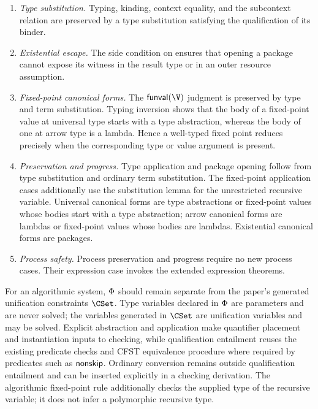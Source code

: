 \begin{enumerate}
  The derived rules require no additional cases: expanding their
  admissibility derivations reduces them to the cases above.  In particular,
  the subject of  is closed, so substitution leaves
  it unchanged.  This completes the induction.
\item \emph{Type substitution.}  Typing, kinding, context equality, and the
  subcontext relation are preserved by a type substitution satisfying the
  qualification of its binder.
\item \emph{Existential escape.}  The side condition on 
  ensures that opening a package cannot expose its witness in the result type
  or in an outer resource assumption.
\item \emph{Fixed-point canonical forms.}  The $\FunVal\V$ judgment is
  preserved by type and term substitution.  Typing inversion shows that the
  body of a fixed-point value at universal type starts with a type
  abstraction, whereas the body of one at arrow type is a lambda.  Hence a
  well-typed fixed point reduces precisely when the corresponding type or
  value argument is present.
\item \emph{Preservation and progress.}  Type application and package opening
  follow from type substitution and ordinary term substitution.  The
  fixed-point application cases additionally use the substitution lemma for
  the unrestricted recursive variable.  Universal canonical forms are type
  abstractions or fixed-point values whose bodies start with a type
  abstraction; arrow canonical forms are lambdas or fixed-point values whose
  bodies are lambdas.  Existential canonical forms are packages.
\item \emph{Process safety.}  Process preservation and progress require no
  new process cases.  Their expression case invokes the extended expression
  theorems.
\end{enumerate}

For an algorithmic system, $\Phi$ should remain separate from the paper's
generated unification constraints $\CSet$.  Type variables declared in
$\Phi$ are parameters and are never solved; the variables generated in
$\CSet$ are unification variables and may be solved.  Explicit abstraction and
application make quantifier placement and instantiation inputs to checking,
while qualification entailment reuses the existing predicate checks and CFST
equivalence procedure where required by predicates such as $\operatorname{\mathsf{nonskip}}$.
Ordinary conversion remains outside qualification entailment and can be
inserted explicitly in a checking derivation.  The algorithmic fixed-point
rule additionally checks the supplied type of the recursive variable; it does
not infer a polymorphic recursive type.

